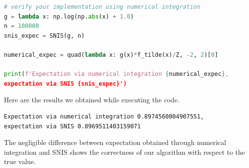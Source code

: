 \begin{enumerate} [(a)]
\begin{lstlisting}[language=Python]
# verify your implementation using numerical integration
g = lambda x: np.log(np.abs(x) + 1.0)
n = 100000
snis_expec = SNIS(g, n)

numerical_expec = quad(lambda x: g(x)*f_tilde(x)/Z, -2, 2)[0]

print(f'Expectation via numerical integration {numerical_expec}, 
expectation via SNIS {snis_expec}')
	\end{lstlisting}
	Here are the results we obtained while executing the code.
	\begin{verbatim}
Expectation via numerical integration 0.8974560004907551, 
expectation via SNIS 0.8969511403159071
	\end{verbatim}
	The negligible difference between expectation obtained through numerical integration and SNIS shows the correctness of our algorithm with respect to the true value.
\end{enumerate}